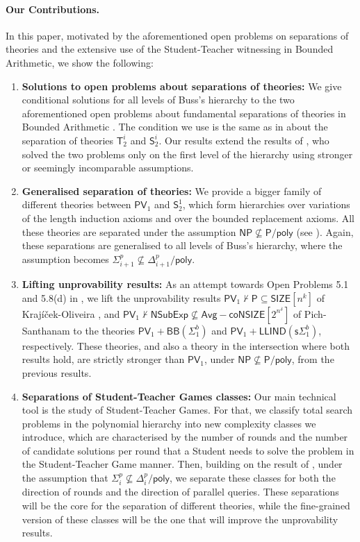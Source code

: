 \documentclass[11pt]{article}
\newcommand{\poly}{\mathsf{poly}}
\renewcommand{\P}{\mathsf{P}}
\newcommand{\NP}{\mathsf{NP}}
\newcommand{\PV}{\mathsf{PV}}
\newcommand{\SOT}{\mathsf{S}^1_2}
\theoremstyle{definition}
\theoremstyle{definition}
\theoremstyle{remark}
\begin{document}
\paragraph{Our Contributions.}
In this paper, motivated by the aforementioned open problems on separations of theories and the extensive use of the Student-Teacher witnessing in Bounded Arithmetic, we show the following:
\begin{enumerate}
    \item\textbf{Solutions to open problems about separations of theories:} We give conditional solutions for all levels of Buss's hierarchy to the two aforementioned open problems about fundamental separations of theories in Bounded Arithmetic \cite{clote1993open,pollett1997arithmetic}. The condition we use is the same as in \cite{KrajicekPT91} about the separation of theories $\mathsf{T}^i_2$ and $\mathsf{S}^i_2$. Our results extend the results of \cite{DBLP:journals/tocl/CookT06,garlik2015model}, who solved the two problems only on the first level of the hierarchy using stronger or seemingly incomparable assumptions.

    \item\textbf{Generalised separation of theories:} We provide a bigger family of different theories between $\PV_1$ and $\SOT$, which form hierarchies over variations of the length induction axioms and over the bounded replacement axioms. All these theories are separated under the assumption $\NP\not\subseteq \P/\poly$ (see ). Again, these separations are generalised to all levels of Buss's hierarchy, where the assumption becomes $\Sigma^p_{i+1}\not \subseteq \Delta^p_{i+1}/\poly$.

    \item\textbf{Lifting unprovability results:} As an attempt towards Open Problems 5.1 and 5.8(d) in \cite{oli2025}, we lift the unprovability results $\PV_1 \nvdash \P \subseteq \mathsf{SIZE}[n^k]$ of Krajíček-Oliveira \cite{KO17}, and $\PV_1 \nvdash \mathsf{NSubExp} \not\subseteq \mathsf{Avg-} \mathsf{coNSIZE}[2^{n^\delta}]$ of Pich-Santhanam \cite{pichS21} to the theories $\PV_1+\mathsf{BB}(\Sigma^b_1)$ and $\PV_1+\mathsf{LLIND}(\mathsf{s}\Sigma^b_1)$, respectively. These theories, and also a theory in the intersection where both results hold, are strictly stronger than $\PV_1$, under $\NP\not\subseteq \P/\poly$, from the previous results.
    
    \item\textbf{Separations of Student-Teacher Games classes:} Our main technical tool is the study of Student-Teacher Games. For that, we classify total search problems in the polynomial hierarchy into new complexity classes we introduce, which are characterised by the number of rounds and the number of candidate solutions per round that a Student needs to solve the problem in the Student-Teacher Game manner. Then, building on the result of \cite{KrajicekPS90}, under the assumption that $\Sigma^p_i\not\subseteq \Delta^p_i/\poly$, we separate these classes for both the direction of rounds and the direction of parallel queries. These separations will be the core for the separation of different theories, while the fine-grained version of these classes will be the one that will improve the unprovability results.


\end{enumerate}
\end{document}
